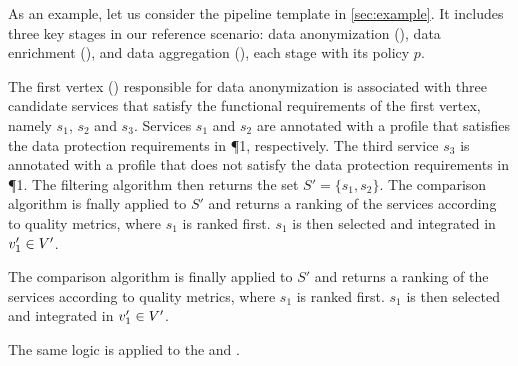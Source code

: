 \begin{example}\label{ex:instance}

  As an example, let us consider the pipeline template \tChartFunction in \cref{sec:example}.
  It includes three key stages in our reference scenario: data anonymization (), data enrichment (), and data aggregation (), each stage with its policy $p$.

  The first vertex () responsible for data anonymization is associated with three candidate services that satisfy the functional requirements of the first vertex, namely $s_1$, $s_2$ and $s_3$.
  Services $s_1$ and $s_2$ are annotated with a profile that satisfies the data protection requirements in \P{1}, respectively.
  The third service $s_3$ is annotated with a profile that does not satisfy the data protection requirements in \P{1}.
  The filtering algorithm then returns the set $S'=\{s_1,s_2\}$.
  The comparison algorithm is fnally applied to $S'$ and returns a ranking of the services according to quality metrics, where $s_1$ is ranked first. $s_1$ is then selected and integrated in $v'_{1}\in V'$.

  The comparison algorithm is finally applied to $S'$ and returns a ranking of the services according to quality metrics, where $s_1$ is ranked first. $s_1$ is then selected and integrated in $v'_{1}\in V'$.

  The same logic is applied to the  and .

\end{example}







